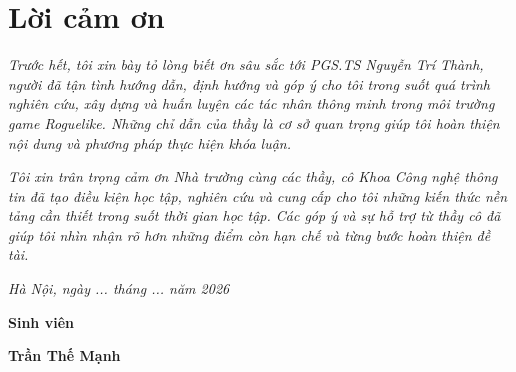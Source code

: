 \clearpage
{}

\chapter*{Lời cảm ơn}

\textit{Trước hết, tôi xin bày tỏ lòng biết ơn sâu sắc tới PGS.TS Nguyễn Trí Thành, người đã tận tình hướng dẫn, định hướng và góp ý cho tôi trong suốt quá trình nghiên cứu, xây dựng và huấn luyện các tác nhân thông minh trong môi trường game Roguelike. Những chỉ dẫn của thầy là cơ sở quan trọng giúp tôi hoàn thiện nội dung và phương pháp thực hiện khóa luận.}

\textit{Tôi xin trân trọng cảm ơn Nhà trường cùng các thầy, cô Khoa Công nghệ thông tin đã tạo điều kiện học tập, nghiên cứu và cung cấp cho tôi những kiến thức nền tảng cần thiết trong suốt thời gian học tập. Các góp ý và sự hỗ trợ từ thầy cô đã giúp tôi nhìn nhận rõ hơn những điểm còn hạn chế và từng bước hoàn thiện đề tài.}

\vspace{1cm}
\hspace{7cm}\textit{Hà Nội, ngày ... tháng ... năm 2026}

\hspace{9.4cm}\textbf{Sinh viên}
\vspace{2.5cm}


\hspace{8.85cm}\textbf{Trần Thế Mạnh}
